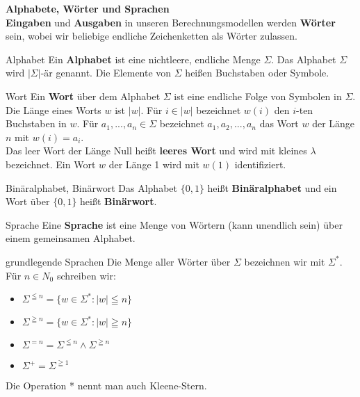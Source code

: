 \textbf{Alphabete, Wörter und Sprachen} \\
\textbf{Eingaben} und \textbf{Ausgaben} in unseren Berechnungsmodellen werden \textbf{Wörter} sein, wobei wir beliebige endliche Zeichenketten als Wörter zulassen.

\begin{defn}{Alphabet}
    Ein \textbf{Alphabet} ist eine nichtleere, endliche Menge $\Sigma$. Das Alphabet $\Sigma$ wird $|{\Sigma}|$-är genannt. Die Elemente von $\Sigma$ heißen Buchstaben oder Symbole.
\end{defn}

\begin{defn}{Wort}
    Ein \textbf{Wort} über dem Alphabet $\Sigma$ ist eine endliche Folge von Symbolen in $\Sigma$. Die Länge eines Worts $w$ ist $|w|$. Für $i \in |w|$ bezeichnet 
    $w(i)$ den $i$-ten Buchstaben in $w$. Für $a_1,..., a_n \in \Sigma$ bezeichnet $a_1, a_2,..., a_n$ das Wort $w$ der Länge $n$ mit $w(i) = a_i$. \\

    Das leer Wort der Länge Null heißt \textbf{leeres Wort} und wird mit kleines $\lambda$ bezeichnet. Ein Wort $w$ der Länge 1 wird mit $w(1)$ identifiziert.
\end{defn}

\begin{defn}{Binäralphabet, Binärwort}
    Das Alphabet $\{0,1\}$ heißt \textbf{Binäralphabet} und ein Wort über $\{0,1\}$ heißt \textbf{Binärwort}.
\end{defn}

\begin{defn}{Sprache}
    Eine \textbf{Sprache} ist eine Menge von Wörtern (kann unendlich sein) über einem gemeinsamen Alphabet.
\end{defn}

\begin{defn}{grundlegende Sprachen}
    Die Menge aller Wörter über $\Sigma$ bezeichnen wir mit $\Sigma^*$.
    Für $n \in N_0$ schreiben wir: 
    \begin{itemize}
        \item $\Sigma^{\leqq n} = \{w \in \Sigma^* : |w| \leqq n \}$
        \item $\Sigma^{\geqq n} = \{w \in \Sigma^* : |w| \geqq n \}$
        \item  $\Sigma^{=n} = \Sigma^{\leqq n} \land \Sigma^{\geqq n}$
        \item  $\Sigma^+ = \Sigma^{\geqq 1}$
    \end{itemize}
    Die Operation * nennt man auch Kleene-Stern.
\end{defn}

